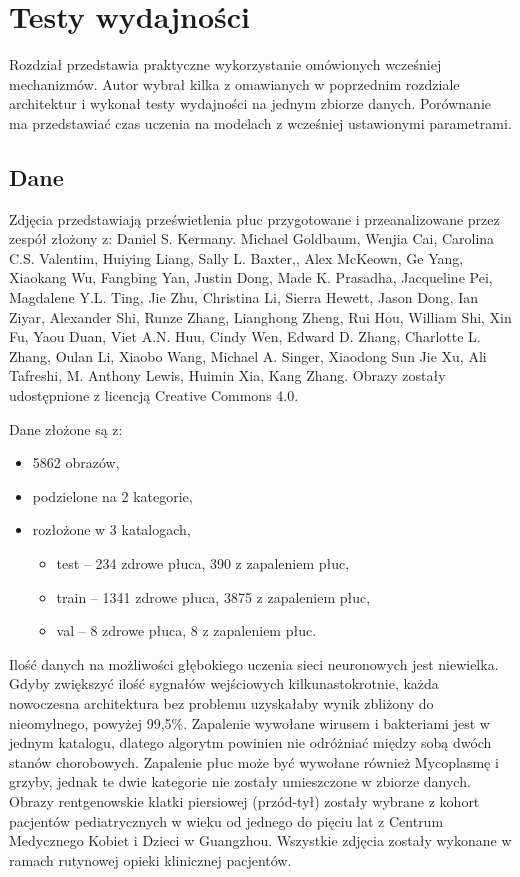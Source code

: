 \documentclass[12pt,a4paper,twoside,titlepage,openright]{book}
\begin{document}
\chapter{Testy wydajności}
Rozdział przedstawia praktyczne wykorzystanie omówionych wcześniej mechanizmów. Autor wybrał kilka z omawianych w poprzednim rozdziale architektur i wykonał testy wydajności na jednym zbiorze danych. Porównanie ma przedstawiać czas uczenia na modelach z wcześniej ustawionymi parametrami.

\section{Dane}
Zdjęcia przedstawiają prześwietlenia płuc przygotowane i przeanalizowane przez zespół złożony z: Daniel S. Kermany. Michael Goldbaum, Wenjia Cai, Carolina C.S. Valentim, Huiying Liang, Sally L. Baxter,, Alex McKeown, Ge Yang, Xiaokang Wu, Fangbing Yan, Justin Dong, Made K. Prasadha, Jacqueline Pei, Magdalene Y.L. Ting, Jie Zhu, Christina Li, Sierra Hewett, Jason Dong, Ian Ziyar, Alexander Shi, Runze Zhang, Lianghong Zheng, Rui Hou, William Shi, Xin Fu, Yaou Duan, Viet A.N. Huu, Cindy Wen, Edward D. Zhang, Charlotte L. Zhang, Oulan Li, Xiaobo Wang, Michael A. Singer, Xiaodong Sun Jie Xu, Ali Tafreshi, M. Anthony Lewis, Huimin Xia, Kang Zhang. Obrazy zostały udostępnione z licencją Creative Commons 4.0. \cite{siteCell}

Dane złożone są z:
\begin{itemize}
\item 5862 obrazów,
\item podzielone na 2 kategorie,
\item rozłożone w 3 katalogach,
\begin{itemize}
\item test -- 234 zdrowe płuca, 390 z zapaleniem płuc,
\item train -- 1341 zdrowe płuca, 3875 z zapaleniem płuc,
\item val -- 8 zdrowe płuca, 8 z zapaleniem płuc.
\end{itemize}
\end{itemize}

Ilość danych na możliwości głębokiego uczenia sieci neuronowych jest niewielka. Gdyby zwiększyć ilość sygnałów wejściowych kilkunastokrotnie, każda nowoczesna architektura bez problemu uzyskałaby wynik zbliżony do nieomylnego, powyżej 99,5\%. Zapalenie wywołane wirusem i bakteriami jest w jednym katalogu, dlatego algorytm powinien nie odróżniać między sobą dwóch stanów chorobowych. Zapalenie płuc może być wywołane również Mycoplasmę i grzyby, jednak te dwie kategorie nie zostały umieszczone w zbiorze danych. Obrazy rentgenowskie klatki piersiowej (przód-tył) zostały wybrane z kohort pacjentów pediatrycznych w wieku od jednego do pięciu lat z Centrum Medycznego Kobiet i Dzieci w Guangzhou. Wszystkie zdjęcia zostały wykonane w ramach rutynowej opieki klinicznej pacjentów.
\end{document}
